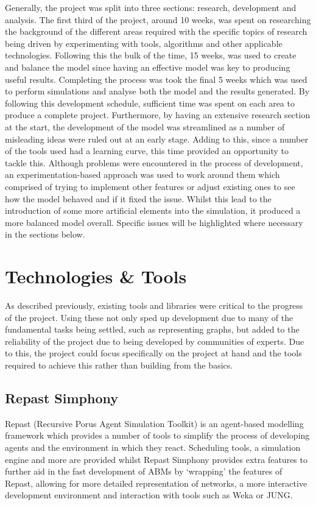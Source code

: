 \documentclass[]{report}
\begin{document}
Generally, the project was split into three sections: research, development and analysis. The first third of the project, around 10 weeks, was spent on researching the background of the different areas required with the specific topics of research being driven by experimenting with tools, algorithms and other applicable technologies. Following this the bulk of the time, 15 weeks, was used to create and balance the model since having an effective model was key to producing useful results. Completing the process was took the final 5 weeks which was used to perform simulations and analyse both the model and the results generated. By following this development schedule, sufficient time was spent on each area to produce a complete project. Furthermore, by having an extensive research section at the start, the development of the model was streamlined as a number of misleading ideas were ruled out at an early stage. Adding to this, since a number of the tools used had a learning curve, this time provided an opportunity to tackle this. Although problems were encountered in the process of development, an experimentation-based approach was used to work around them which comprised of trying to implement other features or adjust existing ones to see how the model behaved and if it fixed the issue. Whilst this lead to the introduction of some more artificial elements into the simulation, it produced a more balanced model overall. Specific issues will be highlighted where necessary in the sections below.

\section{Technologies \& Tools}
As described previously, existing tools and libraries were critical to the progress of the project. Using these not only sped up development due to many of the fundamental tasks being settled, such as representing graphs, but added to the reliability of the project due to being developed by communities of experts. Due to this, the project could focus specifically on the project at hand and the tools required to achieve this rather than building from the basics.

\subsection{Repast Simphony}
Repast (Recursive Porus Agent Simulation Toolkit) is an agent-based modelling framework which provides a number of tools to simplify the process of developing agents and the environment in which they react\cite{repast-main}. Scheduling tools, a simulation engine and more are provided whilst Repast Simphony provides extra features to further aid in the fast development of ABMs by `wrapping' the features of Repast, allowing for more detailed representation of networks, a more interactive development environment and interaction with tools such as Weka or JUNG.
\end{document}
